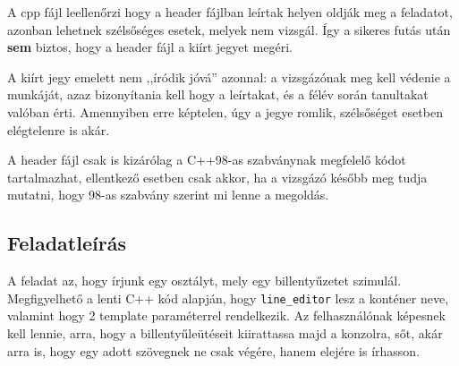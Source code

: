 \documentclass[a4paper,11.5pt,table]{article}
\begin{document}
	A cpp fájl leellenőrzi hogy a header fájlban leírtak helyen oldják meg a feladatot, azonban lehetnek szélsőséges esetek, melyek nem vizsgál. Így a sikeres futás után \textbf{sem} biztos, hogy a header fájl a kiírt jegyet megéri.
	
	A kiírt jegy emelett nem ,,íródik jóvá'' azonnal: a vizsgázónak meg kell védenie a munkáját, azaz bizonyítania kell hogy a leírtakat, és a félév során tanultakat valóban érti. Amennyiben erre képtelen, úgy a jegye romlik, szélsőséget esetben elégtelenre is akár.
	
	A header fájl csak is kizárólag a C++98-as szabványnak megfelelő kódot tartalmazhat, ellentkező esetben csak akkor, ha a vizsgázó később meg tudja mutatni, hogy 98-as szabvány szerint mi lenne a megoldás.
	\subsection{Feladatleírás}
	A feladat az, hogy írjunk egy osztályt, mely egy billentyűzetet szimulál. Megfigyelhető a lenti C++ kód alapján, hogy \texttt{line\_editor} lesz a konténer neve, valamint hogy 2 template paraméterrel rendelkezik. Az felhasználónak képesnek kell lennie, arra, hogy a billentyűleütéseit kiirattassa majd a konzolra, sőt, akár arra is, hogy egy adott szövegnek ne csak végére, hanem elejére is írhasson.
	\medskip
	
\end{document}
